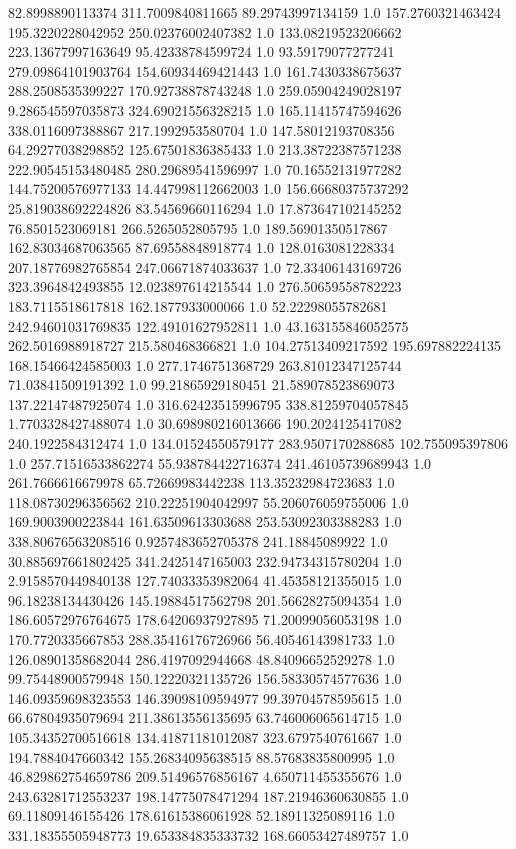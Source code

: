 82.8998890113374	311.7009840811665	89.29743997134159	1.0
157.2760321463424	195.3220228042952	250.02376002407382	1.0
133.08219523206662	223.13677997163649	95.42338784599724	1.0
93.59179077277241	279.09864101903764	154.60934469421443	1.0
161.7430338675637	288.2508535399227	170.92738878743248	1.0
259.05904249028197	9.286545597035873	324.69021556328215	1.0
165.11415747594626	338.0116097388867	217.1992953580704	1.0
147.58012193708356	64.29277038298852	125.67501836385433	1.0
213.38722387571238	222.90545153480485	280.29689541596997	1.0
70.16552131977282	144.75200576977133	14.447998112662003	1.0
156.66680375737292	25.819038692224826	83.54569660116294	1.0
17.873647102145252	76.8501523069181	266.5265052805795	1.0
189.56901350517867	162.83034687063565	87.69558848918774	1.0
128.0163081228334	207.18776982765854	247.06671874033637	1.0
72.33406143169726	323.3964842493855	12.023897614215544	1.0
276.50659558782223	183.7115518617818	162.1877933000066	1.0
52.22298055782681	242.94601031769835	122.49101627952811	1.0
43.163155846052575	262.5016988918727	215.580468366821	1.0
104.27513409217592	195.697882224135	168.15466424585003	1.0
277.1746751368729	263.81012347125744	71.03841509191392	1.0
99.21865929180451	21.589078523869073	137.22147487925074	1.0
316.62423515996795	338.81259704057845	1.7703328427488074	1.0
30.698980216013666	190.2024125417082	240.1922584312474	1.0
134.01524550579177	283.9507170288685	102.755095397806	1.0
257.71516533862274	55.938784422716374	241.46105739689943	1.0
261.7666616679978	65.72669983442238	113.35232984723683	1.0
118.08730296356562	210.22251904042997	55.206076059755006	1.0
169.9003900223844	161.63509613303688	253.53092303388283	1.0
338.80676563208516	0.9257483652705378	241.18845089922	1.0
30.885697661802425	341.2425147165003	232.94734315780204	1.0
2.9158570449840138	127.74033353982064	41.45358121355015	1.0
96.18238134430426	145.19884517562798	201.56628275094354	1.0
186.60572976764675	178.64206937927895	71.20099056053198	1.0
170.7720335667853	288.35416176726966	56.40546143981733	1.0
126.08901358682044	286.4197092944668	48.84096652529278	1.0
99.75448900579948	150.12220321135726	156.58330574577636	1.0
146.09359698323553	146.39098109594977	99.39704578595615	1.0
66.67804935079694	211.38613556135695	63.746006065614715	1.0
105.34352700516618	134.41871181012087	323.6797540761667	1.0
194.7884047660342	155.26834095638515	88.57683835800995	1.0
46.829862754659786	209.51496576856167	4.650711455355676	1.0
243.63281712553237	198.14775078471294	187.21946360630855	1.0
69.11809146155426	178.61615386061928	52.18911325089116	1.0
331.18355505948773	19.653384835333732	168.66053427489757	1.0
